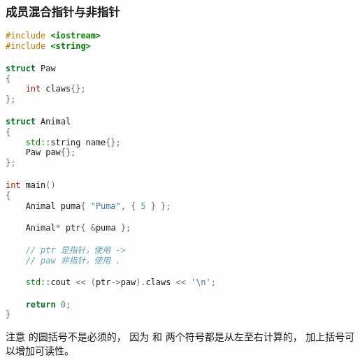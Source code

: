 \documentclass[../../LearnCpp.tex]{subfiles}
\begin{document}
\subsubsection*{成员混合指针与非指针}

\begin{lstlisting}[language=C++]
#include <iostream>
#include <string>

struct Paw
{
    int claws{};
};

struct Animal
{
    std::string name{};
    Paw paw{};
};

int main()
{
    Animal puma{ "Puma", { 5 } };

    Animal* ptr{ &puma };

    // ptr 是指针，使用 ->
    // paw 非指针，使用 .

    std::cout << (ptr->paw).claws << '\n';

    return 0;
}
\end{lstlisting}

注意  的圆括号不是必须的，
因为 \acode{->} 和  两个符号都是从左至右计算的，
加上括号可以增加可读性。
\end{document}
